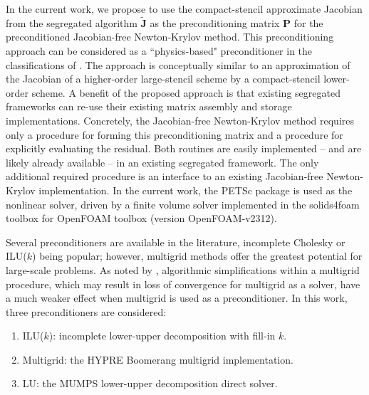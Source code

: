 \documentclass[sn-mathphys,Numbered]{sn-jnl}%
\newcommand{\bb}{\boldsymbol}
\begin{document}
In the current work, we propose to use the compact-stencil approximate Jacobian from the segregated algorithm $\tilde{\bb{J}}$ as the preconditioning matrix $\bb{P}$ for the preconditioned Jacobian-free Newton-Krylov method.
This preconditioning approach can be considered as a ``physics-based" preconditioner in the classifications of \citet{Knoll2004}.
The approach is conceptually similar to an approximation of the Jacobian of a higher-order large-stencil scheme by a compact-stencil lower-order scheme.
A benefit of the proposed approach is that existing segregated frameworks can re-use their existing matrix assembly and storage implementations.
Concretely, the Jacobian-free Newton-Krylov method requires only a procedure for forming this preconditioning matrix and a procedure for explicitly evaluating the residual.
Both routines are easily implemented -- and are likely already available -- in an existing segregated framework.
The only additional required procedure is an interface to an existing Jacobian-free Newton-Krylov implementation.
In the current work, the PETSc package \cite{PETSc} is used as the nonlinear solver, driven by a finite volume solver implemented in the solids4foam toolbox \citep{Cardiff2018, Tukovic2018} for OpenFOAM toolbox \citep{Weller1998} (version OpenFOAM-v2312).

Several preconditioners are available in the literature, incomplete Cholesky or ILU($k$) being popular; however, multigrid methods offer the greatest potential for large-scale problems.
As noted by \citet{Knoll2004}, algorithmic simplifications within a multigrid procedure, which may result in loss of convergence for multigrid as a solver, have a much weaker effect when multigrid is used as a preconditioner.
In this work, three preconditioners are considered:
\begin{enumerate}
	\item ILU($k$): incomplete lower-upper decomposition with fill-in $k$. %
	\item Multigrid: the HYPRE Boomerang \citep{hypre} multigrid implementation.
	\item LU: the MUMPS \citep{MUMPS:1, MUMPS:2} lower-upper decomposition direct solver.
\end{enumerate}
\end{document}
